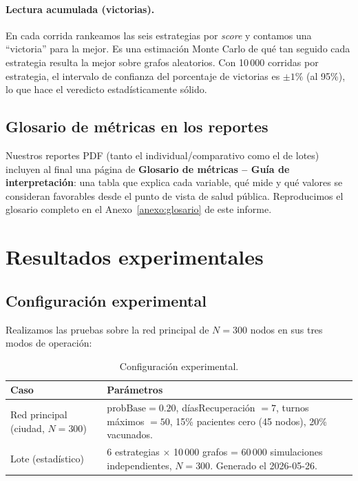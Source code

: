 \documentclass[spanish,notitlepage,letterpaper, 12pt]{article}
\begin{document}
\paragraph{Lectura acumulada (victorias).} En cada corrida rankeamos las seis estrategias por \textit{score} y contamos una ``victoria'' para la mejor. Es una estimaci\'on Monte Carlo de qu\'e tan seguido cada estrategia resulta la mejor sobre grafos aleatorios. Con 10\,000 corridas por estrategia, el intervalo de confianza del porcentaje de victorias es $\pm 1\%$ (al 95\%), lo que hace el veredicto estad\'isticamente s\'olido.

\subsection{Glosario de m\'etricas en los reportes}

Nuestros reportes PDF (tanto el individual/comparativo como el de lotes) incluyen al final una p\'agina de \textbf{Glosario de m\'etricas -- Gu\'ia de interpretaci\'on}: una tabla que explica cada variable, qu\'e mide y qu\'e valores se consideran favorables desde el punto de vista de salud p\'ublica. Reproducimos el glosario completo en el Anexo~\ref{anexo:glosario} de este informe.

\newpage
\newpage
\section{Resultados experimentales}
\label{sec:resultados}

\subsection{Configuración experimental}

Realizamos las pruebas sobre la red principal de $N = 300$ nodos en sus tres modos
de operación:

\begin{table}[H]
\centering
\caption{Configuración experimental.}
\label{tab:config_exp}
\small
\begin{tabular}{l p{8cm}}
\toprule
\textbf{Caso} & \textbf{Parámetros} \\
\midrule
Red principal (ciudad, $N = 300$) & $\text{probBase} = 0.20$,
  díasRecuperación $= 7$, turnos máximos $= 50$,
  15\% pacientes cero (45 nodos), 20\% vacunados. \\
Lote (estadístico) & 6 estrategias $\times$ 10\,000 grafos
  = 60\,000 simulaciones independientes, $N = 300$.
  Generado el 2026-05-26. \\
\bottomrule
\end{tabular}
\end{table}
\end{document}
